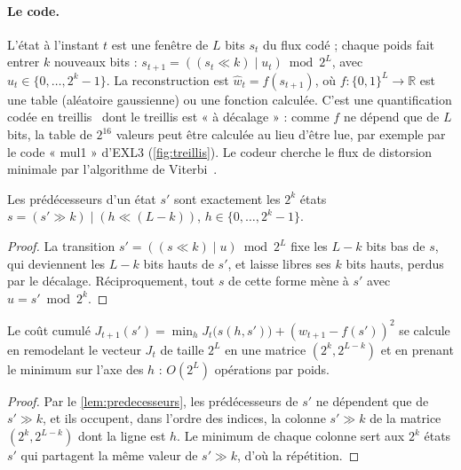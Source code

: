 \paragraph{Le code.} L'état à l'instant $t$ est une fenêtre de $L$ bits $s_t$ du flux codé ; chaque poids fait entrer $k$ nouveaux bits : $s_{t+1} = ((s_t \ll k) \mid u_t) \bmod 2^L$, avec $u_t \in \{0, \dots, 2^k - 1\}$. La reconstruction est $\hat w_t = f(s_{t+1})$, où $f : \{0,1\}^L \to \mathbb R$ est une table (aléatoire gaussienne) ou une fonction calculée. C'est une quantification codée en treillis~\cite{marcellin1990} dont le treillis est « à décalage » : comme $f$ ne dépend que de $L$ bits, la table de $2^{16}$ valeurs peut être calculée au lieu d'être lue, par exemple par le code « mul1 » d'EXL3 (\cref{fig:treillis}). Le codeur cherche le flux de distorsion minimale par l'algorithme de Viterbi~\cite{viterbi1967}.

\begin{lemme}\label{lem:predecesseurs}
Les prédécesseurs d'un état $s'$ sont exactement les $2^k$ états $s = (s' \gg k) \mid (h \ll (L-k))$, $h \in \{0, \dots, 2^k - 1\}$.
\end{lemme}

\begin{proof}
La transition $s' = ((s \ll k) \mid u) \bmod 2^L$ fixe les $L - k$ bits bas de $s$, qui deviennent les $L-k$ bits hauts de $s'$, et laisse libres ses $k$ bits hauts, perdus par le décalage. Réciproquement, tout $s$ de cette forme mène à $s'$ avec $u = s' \bmod 2^k$.
\end{proof}

\begin{corollaire}\label{cor:viterbi}
Le coût cumulé $J_{t+1}(s') = \min_h J_t\bigl(s(h, s')\bigr) + (w_{t+1} - f(s'))^2$ se calcule en remodelant le vecteur $J_t$ de taille $2^L$ en une matrice $(2^k, 2^{L-k})$ et en prenant le minimum sur l'axe des $h$ : $O(2^L)$ opérations par poids.
\end{corollaire}

\begin{proof}
Par le \cref{lem:predecesseurs}, les prédécesseurs de $s'$ ne dépendent que de $s' \gg k$, et ils occupent, dans l'ordre des indices, la colonne $s' \gg k$ de la matrice $(2^k, 2^{L-k})$ dont la ligne est $h$. Le minimum de chaque colonne sert aux $2^k$ états $s'$ qui partagent la même valeur de $s' \gg k$, d'où la répétition.
\end{proof}


